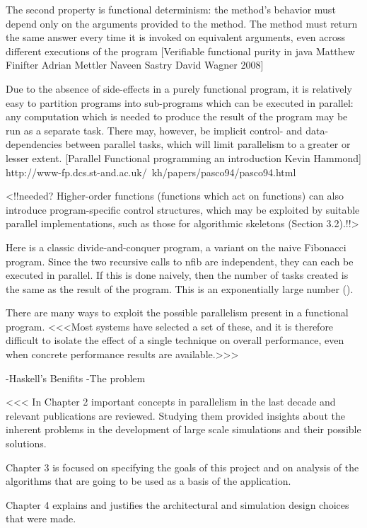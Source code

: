 \documentclass[main.tex]{subfiles}
\begin{document}
The second property is functional determinism: the method’s behavior must depend only on the arguments provided to the method. The method must return the same answer every time it is invoked
on equivalent arguments, even across different executions of the program
[Verifiable functional purity in java Matthew Finifter Adrian Mettler Naveen Sastry David Wagner 2008]

Due to the absence of side-effects in a purely functional program, it is relatively easy to partition programs into sub-programs which can be executed in parallel: any computation which is needed to produce the result of the program may be run as a separate task. There may, however, be implicit control- and data- dependencies between parallel tasks, which will limit parallelism to a greater or lesser extent. [Parallel Functional programming an introduction Kevin Hammond] http://www-fp.dcs.st-and.ac.uk/~kh/papers/pasco94/pasco94.html

<!!needed? Higher-order functions (functions which act on functions) can also introduce program-specific control structures, which may be exploited by suitable parallel implementations, such as those for algorithmic skeletons (Section 3.2).!!>

Here is a classic divide-and-conquer program, a variant on the naive Fibonacci program. Since the two recursive calls to nfib are independent, they can each be executed in parallel. If this is done naively, then the number of tasks created is the same as the result of the program. This is an exponentially large number ().


There are many ways to exploit the possible parallelism present in a functional program. <<<Most systems have selected a set of these, and it is therefore difficult to isolate the effect of a single technique on overall performance, even when concrete performance results are available.>>>



-Haskell's Benifits
-The problem


<<<
In Chapter 2 important concepts in parallelism in the last decade and relevant publications are reviewed. Studying them provided insights about the inherent problems in the development of large scale simulations and their possible solutions.

Chapter 3 is focused on specifying the goals of this project and on analysis of the algorithms that are going to be used as a basis of the application.

Chapter 4 explains and justifies the architectural and simulation design choices that were made.
\end{document}
